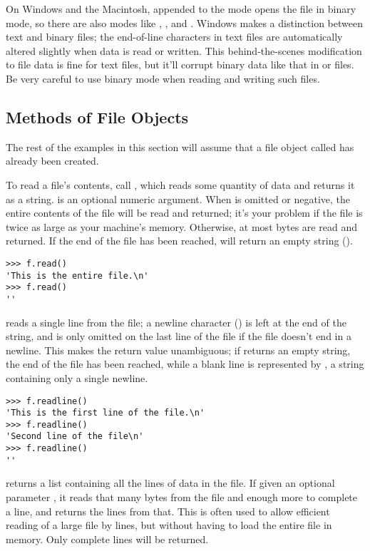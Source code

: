 \documentclass{manual}
\begin{document}
On Windows and the Macintosh,  appended to the
mode opens the file in binary mode, so there are also modes like
, , and .  Windows makes a
distinction between text and binary files; the end-of-line characters
in text files are automatically altered slightly when data is read or
written.  This behind-the-scenes modification to file data is fine for
\ASCII{} text files, but it'll corrupt binary data like that in  or
 files.  Be very careful to use binary mode when reading and
writing such files.

\subsection{Methods of File Objects \label{fileMethods}}

The rest of the examples in this section will assume that a file
object called  has already been created.

To read a file's contents, call , which reads
some quantity of data and returns it as a string.   is an
optional numeric argument.  When  is omitted or negative,
the entire contents of the file will be read and returned; it's your
problem if the file is twice as large as your machine's memory.
Otherwise, at most  bytes are read and returned.  If the end
of the file has been reached,  will return an empty
string ().
\begin{verbatim}
>>> f.read()
'This is the entire file.\n'
>>> f.read()
''
\end{verbatim}

 reads a single line from the file; a newline
character () is left at the end of the string, and is only
omitted on the last line of the file if the file doesn't end in a
newline.  This makes the return value unambiguous; if
 returns an empty string, the end of the file has
been reached, while a blank line is represented by , a
string containing only a single newline.  

\begin{verbatim}
>>> f.readline()
'This is the first line of the file.\n'
>>> f.readline()
'Second line of the file\n'
>>> f.readline()
''
\end{verbatim}

 returns a list containing all the lines of data
in the file.  If given an optional parameter , it reads
that many bytes from the file and enough more to complete a line, and
returns the lines from that.  This is often used to allow efficient
reading of a large file by lines, but without having to load the
entire file in memory.  Only complete lines will be returned.
\end{document}
